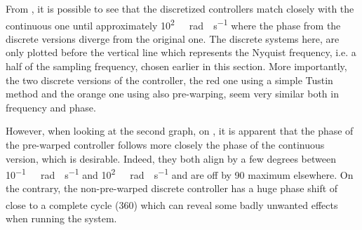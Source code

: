 \begin{minipage}{\linewidth}
\begin{minipage}{0.45\linewidth}
\begin{figure}[H]
      \centering
      \captionsetup{justification=centering}
      \label{fig:bodePrewarpVsNoPrewarpVsContinuousClosedLoop}
    \end{figure}\vspace{-5mm}
  \end{minipage}
\end{minipage}

From , it is possible to see that the discretized controllers match closely with the continuous one until approximately \si{10^{2}\ rad \cdot s^{-1}} where the phase from the discrete versions diverge from the original one. The discrete systems here, are only plotted before the vertical line which represents the Nyquist frequency, i.e. a half of the sampling frequency, chosen earlier in this section. More importantly, the two discrete versions of the controller, the red one using a simple Tustin method and the orange one using also pre-warping, seem very similar both in frequency and phase.

However, when looking at the second graph, on , it is apparent that the phase of the pre-warped controller follows more closely the phase of the continuous version, which is desirable. Indeed, they both align by a few degrees between \si{10^{-1}\ rad \cdot s^{-1}} and \si{10^{2}\ rad \cdot s^{-1}} and are off by \si{90^{\circ}} maximum elsewhere. On the contrary, the non-pre-warped discrete controller has a huge phase shift of close to a complete cycle (\si{360^{\circ}}) which can reveal some badly unwanted effects when running the system.

